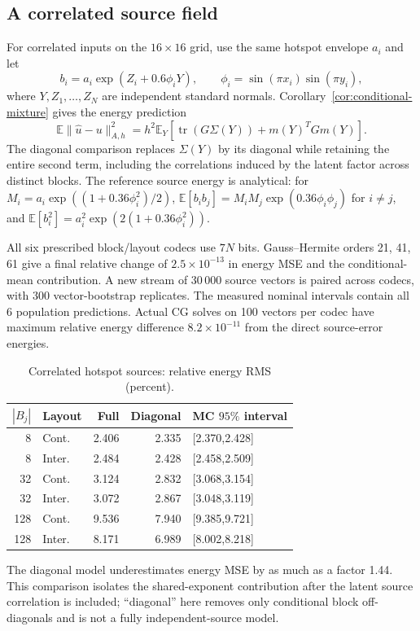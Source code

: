 \subsection{A correlated source field}\label{sec:revision-latent}
For correlated inputs on the $16\times16$ grid, use the same hotspot
envelope $a_i$ and let
\[
 b_i=a_i\exp(Z_i+0.6\phi_iY),\qquad
 \phi_i=\sin(\pi x_i)\sin(\pi y_i),
\]
where $Y,Z_1,\ldots,Z_N$ are independent standard normals.
Corollary~\ref{cor:conditional-mixture} gives the energy prediction
\begin{equation}\label{eq:revision-latent-energy}
 \mathbb E\|\widehat u-u\|_{A,h}^2
 =h^2\mathbb E_Y\!\left[\operatorname{tr}(G\Sigma(Y))
                         +m(Y)^TGm(Y)\right].
\end{equation}
The diagonal comparison replaces $\Sigma(Y)$ by its diagonal while retaining
the entire second term, including the correlations induced by the latent
factor across distinct blocks. The reference source energy is analytical:
for $M_i=a_i\exp((1+0.36\phi_i^2)/2)$,
$\mathbb E[b_ib_j]=M_iM_j\exp(0.36\phi_i\phi_j)$ for $i\ne j$, and
$\mathbb E[b_i^2]=a_i^2\exp(2(1+0.36\phi_i^2))$.

All six prescribed block/layout codecs use $7N$ bits. Gauss--Hermite orders
21, 41, 61 give a final relative change of $2.5\times10^{-13}$ in energy MSE and the
conditional-mean contribution. A new stream of 30\,000 source vectors is paired
across codecs, with 300 vector-bootstrap replicates. The measured
nominal intervals contain all 6 population predictions. Actual CG solves
on 100 vectors per codec have maximum relative energy difference
$8.2\times10^{-11}$ from the direct source-error energies.

\begin{table}[tb]
\centering
\caption{Correlated hotspot sources: relative energy RMS (percent).}
\label{tab:revision-latent}
\begingroup\footnotesize\setlength{\tabcolsep}{4pt}
\begin{tabular}{rlrrl}
\toprule
$|B_j|$ & Layout & Full & Diagonal & MC $95\%$ interval\\
\midrule
8 & Cont. & 2.406 & 2.335 & [2.370,2.428] \\
8 & Inter. & 2.484 & 2.428 & [2.458,2.509] \\
32 & Cont. & 3.124 & 2.832 & [3.068,3.154] \\
32 & Inter. & 3.072 & 2.867 & [3.048,3.119] \\
128 & Cont. & 9.536 & 7.940 & [9.385,9.721] \\
128 & Inter. & 8.171 & 6.989 & [8.002,8.218] \\
\bottomrule
\end{tabular}\endgroup
\end{table}
The diagonal model underestimates energy MSE by as much as a factor
1.44. This comparison isolates the shared-exponent contribution after
the latent source correlation is included; ``diagonal'' here removes only
conditional block off-diagonals and is not a fully independent-source model.
